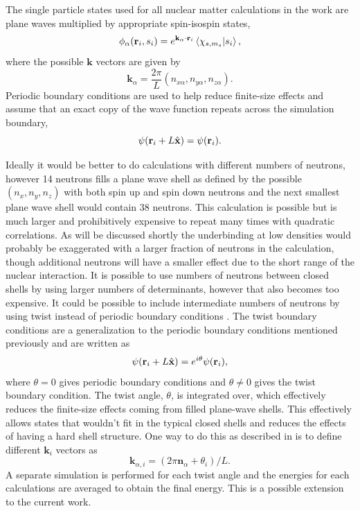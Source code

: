 The single particle states used for all nuclear matter calculations in the work are plane waves multiplied by appropriate spin-isospin states,
\begin{equation}
   \phi_\alpha(\mathbf{r}_i,s_i) = e^{\mathbf{k}_\alpha\cdot\mathbf{r}_i}\left< \chi_{s,m_s} | s_i \right>,
\end{equation}
where the possible $\mathbf{k}$ vectors are given by
\begin{equation}
   \mathbf{k}_\alpha = \frac{2\pi}{L}(n_{x\alpha},n_{y\alpha},n_{z\alpha}).
\end{equation}
Periodic boundary conditions are used to help reduce finite-size effects and assume that an exact copy of the wave function repeats across the simulation boundary,
\begin{equation}
   \psi(\mathbf{r}_i+L\hat{\mathbf{x}}) = \psi(\mathbf{r}_i).
\end{equation}

Ideally it would be better to do calculations with different numbers of neutrons, however 14 neutrons fills a plane wave shell as defined by the possible $(n_{x},n_{y},n_{z})$ with both spin up and spin down neutrons and the next smallest plane wave shell would contain 38 neutrons. This calculation is possible but is much larger and prohibitively expensive to repeat many times with quadratic correlations. As will be discussed shortly the underbinding at low densities would probably be exaggerated with a larger fraction of neutrons in the calculation, though additional neutrons will have a smaller effect due to the short range of the nuclear interaction. It is possible to use numbers of neutrons between closed shells by using larger numbers of determinants, however that also becomes too expensive. It could be possible to include intermediate numbers of neutrons by using twist instead of periodic boundary conditions \cite{lin2001}. The twist boundary conditions are a generalization to the periodic boundary conditions mentioned previously and are written as
\begin{equation}
   \psi(\mathbf{r}_i+L\hat{\mathbf{x}}) = e^{i\theta}\psi(\mathbf{r}_i),
\end{equation}
where $\theta=0$ gives periodic boundary conditions and $\theta\ne0$ gives the twist boundary condition. The twist angle, $\theta$, is integrated over, which effectively reduces the finite-size effects coming from filled plane-wave shells. This effectively allows states that wouldn't fit in the typical closed shells and reduces the effects of having a hard shell structure. One way to do this as described in \cite{gandolfi2009} is to define different $\mathbf{k}_i$ vectors as
\begin{equation}
   \mathbf{k}_{\alpha,i} = (2\pi\mathbf{n}_\alpha + \theta_i)/L.
\end{equation}
A separate simulation is performed for each twist angle and the energies for each calculations are averaged to obtain the final energy. This is a possible extension to the current work.

